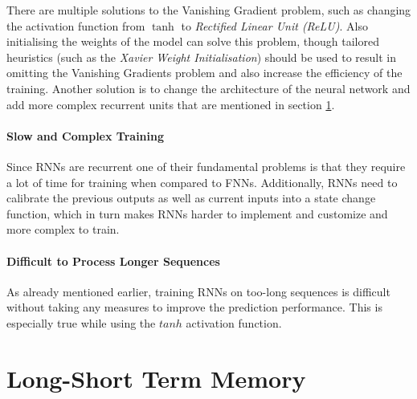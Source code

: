                There are multiple solutions to the Vanishing Gradient problem, such as changing the activation function from $\tanh$ to \emph{Rectified Linear Unit (ReLU)}. Also initialising the weights of the model can solve this problem, though tailored heuristics (such as the \emph{Xavier Weight Initialisation}) should be used to result in omitting the Vanishing Gradients problem and also increase the efficiency of the training. Another solution is to change the architecture of the neural network and add more complex recurrent units that are mentioned in section \ref{sec:lstm-background}.

            \paragraph{Slow and Complex Training }

                Since RNNs are recurrent one of their fundamental problems is that they require a lot of time for training when compared to FNNs. Additionally, RNNs need to calibrate the previous outputs as well as current inputs into a state change function, which in turn makes RNNs harder to implement and customize and more complex to train.

            \paragraph{Difficult to Process Longer Sequences }

                As already mentioned earlier, training RNNs on too-long sequences is difficult without taking any measures to improve the prediction performance. This is especially true while using the $tanh$ activation function. 
                
    \section{Long-Short Term Memory}
    \label{sec:lstm-background}

